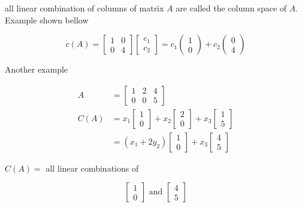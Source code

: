 \documentclass[main.tex]{subfiles}
\begin{document}
    all linear combination of columns of matrix $A$ are called the column space of $A$. Example shown bellow
    
    $$
    c(A)=\left[\begin{array}{ll}
    1 & 0 \\
    0 & 4
    \end{array}\right]\left[\begin{array}{l}
    c_{1} \\
    c_{2}
    \end{array}\right]=c_{1}\left(\begin{array}{l}
    1 \\
    0
    \end{array}\right)+c_{2}\left(\begin{array}{l}
    0 \\
    4
    \end{array}\right)
    $$
    
    Another example
    
    $$
    \begin{aligned}
    A & = \left[\begin{array}{lll}
    1 & 2 & 4 \\
    0 & 0 & 5
    \end{array}\right]\\
    C(A) & = x_{1}\left[\begin{array}{l}
    1 \\
    0
    \end{array}\right]+x_{2}\left[\begin{array}{l}
    2 \\
    0
    \end{array}\right]+x_{3}\left[\begin{array}{l}
    1 \\
    5
    \end{array}\right]\\
    & =\left(x_{1}+2 y_{2}\right)\left[\begin{array}{l}
    1 \\
    0
    \end{array}\right]+x_{3}\left[\begin{array}{l}
    4 \\
    5
    \end{array}\right]
    \end{aligned}
    $$
    
    $C(A)=$ all linear combinations of
    
    $$
    \left[\begin{array}{l}
    1 \\
    0
    \end{array}\right] \text { and }\left[\begin{array}{l}
    4 \\
    5
    \end{array}\right]
    $$
    
\end{document}
